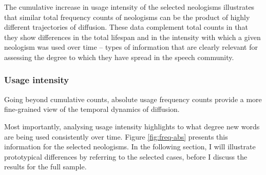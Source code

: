 \documentclass[
  a4paper,
  abstract=on,
  captions=tableabove,
  ]{scrartcl}
\begin{document}
      The cumulative increase in usage intensity of the selected neologisms illustrates that similar total frequency counts of neologisms can be the product of highly different trajectories of diffusion. These data complement total counts in that they show differences in the total lifespan and in the intensity with which a given neologism was used over time -- types of information that are clearly relevant for assessing the degree to which they have spread in the speech community.


    \subsubsection{Usage intensity}

      Going beyond cumulative counts, absolute usage frequency counts provide a more fine-grained view of the temporal dynamics of diffusion. 


      Most importantly, analysing usage intensity highlights to what degree new words are being used consistently over time. Figure \ref{fig:freq-abs} presents this information for the selected neologisms. In the following section, I will illustrate prototypical differences by referring to the selected cases, before I discuss the results for the full sample. 
\end{document}
